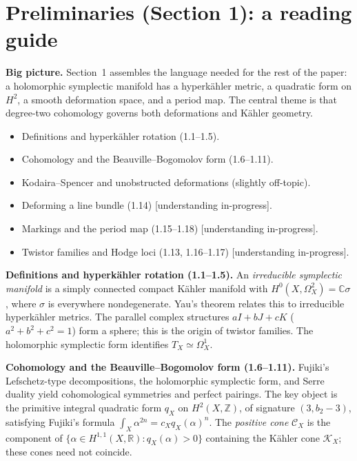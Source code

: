 \documentclass[11pt]{article}
\begin{document}
\section{Preliminaries (Section 1): a reading guide}

\noindent
\textbf{Big picture.}
Section~1 assembles the language needed for the rest of
the paper: a holomorphic symplectic manifold has a
hyperk\"ahler metric, a quadratic form on $H^2$, a
smooth deformation space, and a period map.
The central theme is that degree-two cohomology
governs both deformations and K\"ahler geometry.

\begin{itemize}
\item Definitions and hyperk\"ahler rotation (1.1--1.5).
\item Cohomology and the Beauville--Bogomolov form (1.6--1.11).
\item Kodaira--Spencer and unobstructed deformations (slightly off-topic).
\item Deforming a line bundle (1.14) [understanding in-progress].
\item Markings and the period map (1.15--1.18) [understanding in-progress].
\item Twistor families and Hodge loci (1.13, 1.16--1.17) [understanding in-progress].
\end{itemize}

\par\smallskip\noindent
\textbf{Definitions and hyperk\"ahler rotation
(1.1--1.5).}
An \emph{irreducible symplectic manifold} is a
simply connected compact K\"ahler manifold with
$H^0(X,\Omega_X^2)=\mathbb C\sigma$, where $\sigma$
is everywhere nondegenerate. Yau's theorem relates
this to irreducible hyperk\"ahler metrics.
The parallel complex structures
$aI+bJ+cK$ ($a^2+b^2+c^2=1$) form a
sphere; this is the origin of twistor families.
The holomorphic symplectic form identifies
$T_X\simeq\Omega_X^1$.

\par\smallskip\noindent
\textbf{Cohomology and the Beauville--Bogomolov
form (1.6--1.11).}
Fujiki's Lefschetz-type decompositions,
the holomorphic symplectic form, and
Serre duality yield cohomological symmetries
and perfect pairings. The key object is the
primitive integral quadratic form
$q_X$ on $H^2(X,\mathbb Z)$, of signature
$(3,b_2-3)$, satisfying Fujiki's formula
$\int_X\alpha^{2n}=c_Xq_X(\alpha)^n$.
The \emph{positive cone} $\mathcal C_X$ is
the component of
$\{\alpha\in H^{1,1}(X,\mathbb R):
q_X(\alpha)>0\}$ containing the K\"ahler
cone $\mathcal K_X$; these cones need
not coincide.
\end{document}
